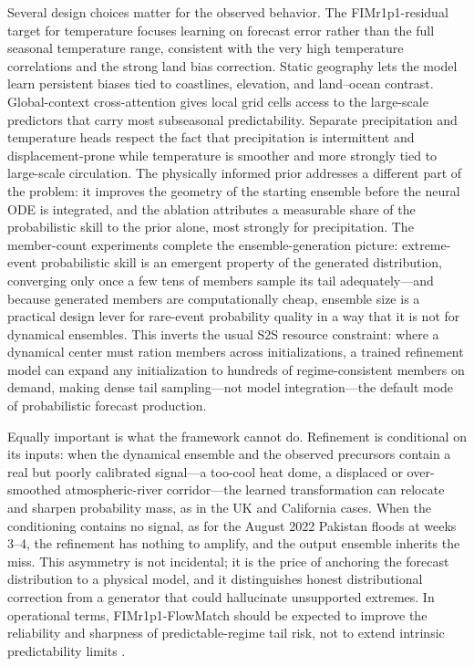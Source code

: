 \documentclass[11pt]{article}
\newcommand{\modelshort}{FIMr1p1}
\newcommand{\methodname}{\modelshort{}-FlowMatch}
\begin{document}
Several design choices matter for the observed behavior. The \modelshort{}-residual target for temperature focuses learning on forecast error rather than the full seasonal temperature range, consistent with the very high temperature correlations and the strong land bias correction. Static geography lets the model learn persistent biases tied to coastlines, elevation, and land--ocean contrast. Global-context cross-attention gives local grid cells access to the large-scale predictors that carry most subseasonal predictability. Separate precipitation and temperature heads respect the fact that precipitation is intermittent and displacement-prone while temperature is smoother and more strongly tied to large-scale circulation. The physically informed prior addresses a different part of the problem: it improves the geometry of the starting ensemble before the neural ODE is integrated, and the ablation attributes a measurable share of the probabilistic skill to the prior alone, most strongly for precipitation. The member-count experiments complete the ensemble-generation picture: extreme-event probabilistic skill is an emergent property of the generated distribution, converging only once a few tens of members sample its tail adequately---and because generated members are computationally cheap, ensemble size is a practical design lever for rare-event probability quality in a way that it is not for dynamical ensembles. This inverts the usual S2S resource constraint: where a dynamical center must ration members across initializations, a trained refinement model can expand any initialization to hundreds of regime-consistent members on demand, making dense tail sampling---not model integration---the default mode of probabilistic forecast production.

Equally important is what the framework cannot do. Refinement is conditional on its inputs: when the dynamical ensemble and the observed precursors contain a real but poorly calibrated signal---a too-cool heat dome, a displaced or over-smoothed atmospheric-river corridor---the learned transformation can relocate and sharpen probability mass, as in the UK and California cases. When the conditioning contains no signal, as for the August 2022 Pakistan floods at weeks 3--4, the refinement has nothing to amplify, and the output ensemble inherits the miss. This asymmetry is not incidental; it is the price of anchoring the forecast distribution to a physical model, and it distinguishes honest distributional correction from a generator that could hallucinate unsupported extremes. In operational terms, \methodname{} should be expected to improve the reliability and sharpness of predictable-regime tail risk, not to extend intrinsic predictability limits \citep{Vitart2017}.
\end{document}
